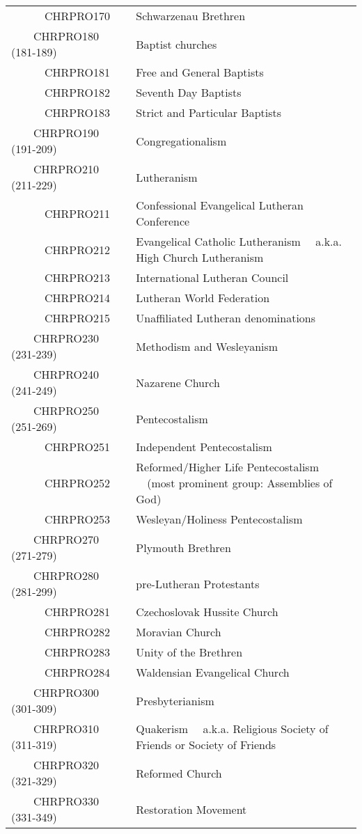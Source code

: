 \documentclass[12pt]{article}
\begin{document}
\begin{tiny}
\begin{center}
\begin{longtable}{|l|l|}
~~~~~~CHRPRO170 & Schwarzenau Brethren \\
~~~~CHRPRO180 (181-189) & Baptist churches \\
~~~~~~CHRPRO181 & Free and General Baptists \\
~~~~~~CHRPRO182 & Seventh Day Baptists \\
~~~~~~CHRPRO183 & Strict and Particular Baptists \\
~~~~CHRPRO190 (191-209) & Congregationalism \\
~~~~CHRPRO210 (211-229) & Lutheranism \\
~~~~~~CHRPRO211 & Confessional Evangelical Lutheran Conference \\
~~~~~~CHRPRO212 & Evangelical Catholic Lutheranism	~~a.k.a. High Church Lutheranism \\
~~~~~~CHRPRO213 & International Lutheran Council \\
~~~~~~CHRPRO214 & Lutheran World Federation \\
~~~~~~CHRPRO215 & Unaffiliated Lutheran denominations \\
~~~~CHRPRO230 (231-239) & Methodism and Wesleyanism \\
~~~~CHRPRO240 (241-249) & Nazarene Church \\
~~~~CHRPRO250 (251-269) & Pentecostalism \\
~~~~~~CHRPRO251 & Independent Pentecostalism \\
~~~~~~CHRPRO252 & Reformed/Higher Life Pentecostalism	~~(most prominent group: Assemblies of God) \\
~~~~~~CHRPRO253 & Wesleyan/Holiness Pentecostalism \\
~~~~CHRPRO270 (271-279) & Plymouth Brethren \\
~~~~CHRPRO280 (281-299) & pre-Lutheran Protestants \\
~~~~~~CHRPRO281 & Czechoslovak Hussite Church \\
~~~~~~CHRPRO282 & Moravian Church \\
~~~~~~CHRPRO283 & Unity of the Brethren \\
~~~~~~CHRPRO284 & Waldensian Evangelical Church \\
~~~~CHRPRO300 (301-309) & Presbyterianism \\
~~~~CHRPRO310 (311-319) & Quakerism	~~a.k.a. Religious Society of Friends or Society of Friends \\
~~~~CHRPRO320 (321-329) & Reformed Church \\
~~~~CHRPRO330 (331-349) & Restoration Movement \\

\end{longtable}
\end{center}
\end{tiny}
\end{document}
